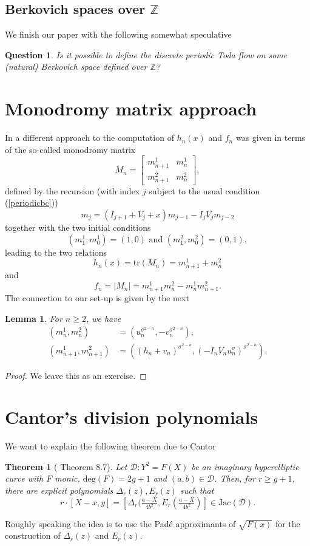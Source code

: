 \documentclass[11pt, a4paper]{amsart}
\newcommand{\eqst}[1]{\begin{equation*}#1\end{equation*}}
\theoremstyle{plain}
\newtheorem{theorem}{Theorem}[section]
\newtheorem{lemma}{Lemma}[section]
\newtheorem{question}{Question}[section]
\numberwithin{equation}{section}
\begin{document}
\subsection*{Berkovich spaces over $\mathbb Z$}
We finish our paper with the following somewhat speculative
\begin{question}
Is it possible to define the discrete periodic Toda flow on some (natural) Berkovich space defined over $\mathbb Z$?
\end{question}


\appendix
\section{Monodromy matrix approach}
In \cite{tokihiro1} a different approach to the computation of $h_n(x)$ and $f_n$ was given in terms of the so-called monodromy matrix \eqst{ M_n = \begin{bmatrix} m^1_{n+1} & m^1_n \\ m^2_{n+1} & m^2_n\end{bmatrix},} defined by the recursion (with index $j$ subject to the usual condition (\ref{periodicbc})) \eqst{m_{j} = (I_{j+1}+V_j +x) m_{j-1}- I_j V_j m_{j-2} } together with the two initial conditions \eqst{(m^1_1,m^1_0) = (1,0) \text{ and } (m^2_1,m^2_0) = (0,1),}
leading to the two relations \eqst{h_n(x) = \mathrm{tr}(M_n) =  m^1_{n+1}+m^2_{n} } and \eqst{f_n = \vert M_n \vert = m^1_{n+1}m^2_{n}-m^1_n m^2_{n+1}.}
The connection to our set-up is given by the next
\begin{lemma}
For $n \geq 2$, we have \begin{align*}(m^1_n,m^2_n) &= (u_n^{\sigma^{2-n}},-v_n^{\sigma^{2-n}}), \\
(m^1_{n+1},m^2_{n+1}) &= ((h_n+v_n)^{\sigma^{2-n}},(-I_nV_n u_n^\sigma)^{\sigma^{2-n}}).\end{align*}
\end{lemma}
\begin{proof}
We leave this as an exercise. 
\end{proof}

\section{Cantor's division polynomials}

\noindent We want to explain the following theorem due to Cantor
\begin{theorem}[\cite{cantordivision} Theorem 8.7]
\label{cantortheorem}
Let $\mathcal D: Y^2 = F(X)$ be an imaginary hyperelliptic curve with 
$F$ monic, $\mathrm{deg}(F) = 2g+1$ and $(a,b) \in \mathcal D$. Then, for $r \geq g+1$, there are explicit polynomials $\Delta_r(z),E_r(z)$ such that\eqst{r\cdot [X-x,y] = [\Delta_r(\tfrac{a-X}{4b^2},E_r(\tfrac{a-X}{4b^2})] \in \mathrm{Jac(\mathcal D)}.}
\end{theorem}
\noindent Roughly speaking the idea is to use the Padé approximants of $\sqrt{F(x)}$ for the construction of $\Delta_r(z)$ and $E_r(z)$.
\end{document}
